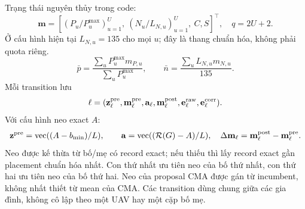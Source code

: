 \documentclass[11pt,a4paper]{article}
\newcommand{\vct}{\operatorname{vec}}
\begin{document}
Trạng thái nguyên thủy trong code:
\[
\mathbf m=\left[(P_u/P_u^{\max})_{u=1}^U,\ (N_u/L_{N,u})_{u=1}^U,\ C,S\right]^\top,\quad q=2U+2.
\]
Ở cấu hình hiện tại $L_{N,u}=135$ cho mọi $u$; đây là thang chuẩn hóa, không phải quota riêng.
\[
\bar p=\frac{\sum_uP_u^{\max}m_{P,u}}{\sum_uP_u^{\max}},\qquad
\bar n=\frac{\sum_uL_{N,u}m_{N,u}}{135}.
\]
Mỗi transition lưu
\[
\ell=(\mathbf z_\ell^{\rm pre},\mathbf m_\ell^{\rm pre},\mathbf a_\ell,
\mathbf m_\ell^{\rm post},\mathbf e_\ell^{\rm raw},\mathbf e_\ell^{\rm corr}).
\]
Với cấu hình neo exact $A$:
\[
\mathbf z^{\rm pre}=\vct((A-b_{\min})/L),\qquad
\mathbf a=\vct((\mathcal R(G)-A)/L),\quad
\Delta\mathbf m_\ell=\mathbf m_\ell^{\rm post}-\mathbf m_\ell^{\rm pre}.
\]
Neo được kế thừa từ bố/mẹ có record exact; nếu thiếu thì lấy record exact gần placement chuẩn hóa nhất.
Con thứ nhất ưu tiên neo của bố thứ nhất, con thứ hai ưu tiên neo của bố thứ hai. Neo của proposal CMA được gán từ incumbent, không nhất thiết từ mean của CMA.
Các transition dùng chung giữa các gia đình, không cô lập theo một UAV hay một cặp bố mẹ.
\end{document}
